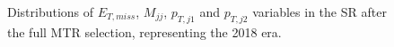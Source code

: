 \begin{figure}[htbp]
{    }
  \caption{Distributions of $E_{T,miss}$, $M_{jj}$, $p_{T,j1}$ and $p_{T,j2}$ variables in the SR after the full MTR selection, representing the 2018 era.}
  \label{fig:2018_SR_motivation_2}
\end{figure}



